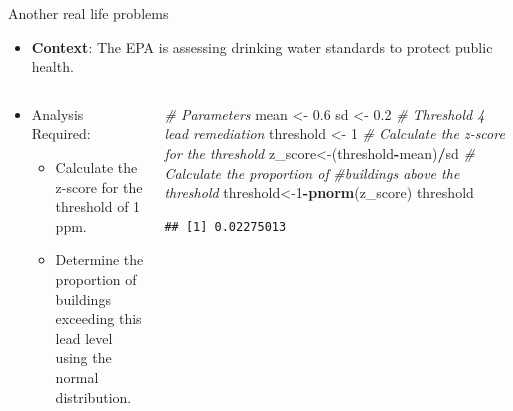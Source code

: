 \documentclass[
  ignorenonframetext,
]{beamer}
\newenvironment{Shaded}{\begin{snugshade}}{\end{snugshade}}
\newcommand{\CommentTok}[1]{\textcolor[rgb]{0.56,0.35,0.01}{\textit{#1}}}
\newcommand{\DecValTok}[1]{\textcolor[rgb]{0.00,0.00,0.81}{#1}}
\newcommand{\FloatTok}[1]{\textcolor[rgb]{0.00,0.00,0.81}{#1}}
\newcommand{\FunctionTok}[1]{\textcolor[rgb]{0.13,0.29,0.53}{\textbf{#1}}}
\newcommand{\NormalTok}[1]{#1}
\newcommand{\OtherTok}[1]{\textcolor[rgb]{0.56,0.35,0.01}{#1}}
\newcommand{\SpecialCharTok}[1]{\textcolor[rgb]{0.81,0.36,0.00}{\textbf{#1}}}
\providecommand{\tightlist}{%
  \setlength{\itemsep}{0pt}\setlength{\parskip}{0pt}}
\begin{document}
\begin{frame}[fragile]{Another real life problems}
\label{another-real-life-problems-2}
\small

\begin{itemize}
\tightlist
\item
  \textbf{Context}: The EPA is assessing drinking water standards to
  protect public health.\\
\end{itemize}

\begin{columns}[T]
\begin{column}{0.5\textwidth}
\small

\begin{itemize}
\tightlist
\item
  Analysis Required:

  \begin{itemize}
  \tightlist
  \item
    Calculate the z-score for the threshold of 1 ppm.
  \item
    Determine the proportion of buildings exceeding this lead level
    using the normal distribution.\\
  \end{itemize}
\end{itemize}
\end{column}

\begin{column}{0.5\textwidth}
\begin{Shaded}
\begin{Highlighting}[]
\CommentTok{\# Parameters}
\NormalTok{mean }\OtherTok{\textless{}{-}} \FloatTok{0.6}
\NormalTok{sd }\OtherTok{\textless{}{-}} \FloatTok{0.2}
\CommentTok{\# Threshold 4 lead remediation}
\NormalTok{threshold }\OtherTok{\textless{}{-}} \DecValTok{1}
\CommentTok{\# Calculate the z{-}score for the threshold}
\NormalTok{z\_score}\OtherTok{\textless{}{-}}\NormalTok{(threshold}\SpecialCharTok{{-}}\NormalTok{mean)}\SpecialCharTok{/}\NormalTok{sd}
\CommentTok{\# Calculate the proportion of }
\CommentTok{\#buildings above the threshold}
\NormalTok{threshold}\OtherTok{\textless{}{-}}\DecValTok{1}\SpecialCharTok{{-}}\FunctionTok{pnorm}\NormalTok{(z\_score)}
\NormalTok{threshold}
\end{Highlighting}
\end{Shaded}

\begin{verbatim}
## [1] 0.02275013
\end{verbatim}
\end{column}
\end{columns}
\end{frame}

\begin{frame}{}
\label{section-1}
\end{frame}
\end{document}
